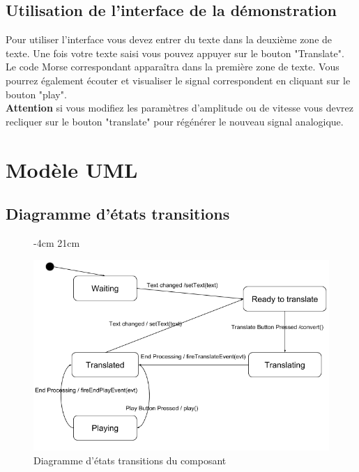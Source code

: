 \documentclass[a4paper,11pt]{article}
\begin{document}
    \subsection{Utilisation de l'interface de la démonstration}
    Pour utiliser l'interface vous devez entrer du texte dans la deuxième zone de texte. Une fois votre texte saisi vous pouvez appuyer sur le bouton "Translate". Le code Morse correspondant apparaîtra dans la première zone de texte. Vous pourrez également écouter et visualiser le signal correspondent en cliquant sur le bouton "play".\\
    \textbf{Attention} si vous modifiez les paramètres d'amplitude ou de vitesse vous devrez recliquer sur le bouton "translate" pour régénérer le nouveau signal analogique.
    

    \section{Modèle UML}
    \subsection{Diagramme d'états transitions}
     \begin{figure}[H]
    	 -4cm 21cm
    	\begin{center}
    		\includegraphics[scale=0.8]{etatsdiag.png}
    		\caption{Diagramme d'états transitions du composant}
    		\label{Diagramme d'états transitions du composant}
    	\end{center}
    \end{figure}
\end{document}
